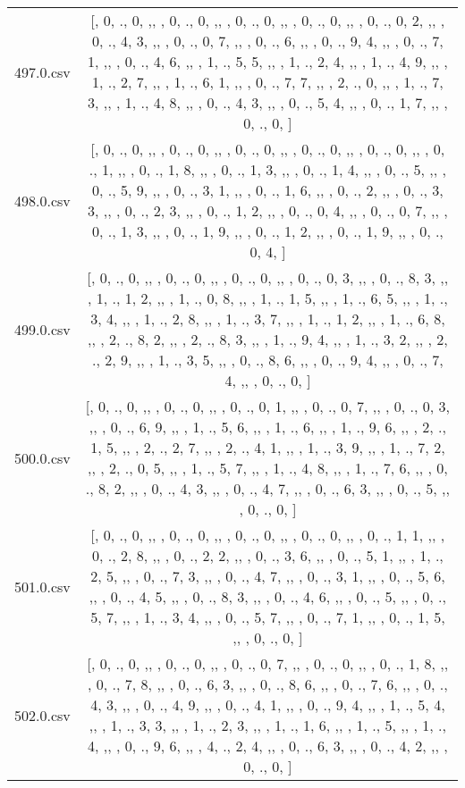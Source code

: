 \begin{table}[ht]
\begin{tabular}{@{}c c@{}}
	497.0.csv & [, 0, ., 0, ,,  , 0, ., 0, ,,  , 0, ., 0, ,,  , 0, ., 0, ,,  , 0, ., 0, 2, ,,  , 0, ., 4, 3, ,,  , 0, ., 0, 7, ,,  , 0, ., 6, ,,  , 0, ., 9, 4, ,,  , 0, ., 7, 1, ,,  , 0, ., 4, 6, ,,  , 1, ., 5, 5, ,,  , 1, ., 2, 4, ,,  , 1, ., 4, 9, ,,  , 1, ., 2, 7, ,,  , 1, ., 6, 1, ,,  , 0, ., 7, 7, ,,  , 2, ., 0, ,,  , 1, ., 7, 3, ,,  , 1, ., 4, 8, ,,  , 0, ., 4, 3, ,,  , 0, ., 5, 4, ,,  , 0, ., 1, 7, ,,  , 0, ., 0, ]\\ 
	498.0.csv & [, 0, ., 0, ,,  , 0, ., 0, ,,  , 0, ., 0, ,,  , 0, ., 0, ,,  , 0, ., 0, ,,  , 0, ., 1, ,,  , 0, ., 1, 8, ,,  , 0, ., 1, 3, ,,  , 0, ., 1, 4, ,,  , 0, ., 5, ,,  , 0, ., 5, 9, ,,  , 0, ., 3, 1, ,,  , 0, ., 1, 6, ,,  , 0, ., 2, ,,  , 0, ., 3, 3, ,,  , 0, ., 2, 3, ,,  , 0, ., 1, 2, ,,  , 0, ., 0, 4, ,,  , 0, ., 0, 7, ,,  , 0, ., 1, 3, ,,  , 0, ., 1, 9, ,,  , 0, ., 1, 2, ,,  , 0, ., 1, 9, ,,  , 0, ., 0, 4, ]\\ 
	499.0.csv & [, 0, ., 0, ,,  , 0, ., 0, ,,  , 0, ., 0, ,,  , 0, ., 0, 3, ,,  , 0, ., 8, 3, ,,  , 1, ., 1, 2, ,,  , 1, ., 0, 8, ,,  , 1, ., 1, 5, ,,  , 1, ., 6, 5, ,,  , 1, ., 3, 4, ,,  , 1, ., 2, 8, ,,  , 1, ., 3, 7, ,,  , 1, ., 1, 2, ,,  , 1, ., 6, 8, ,,  , 2, ., 8, 2, ,,  , 2, ., 8, 3, ,,  , 1, ., 9, 4, ,,  , 1, ., 3, 2, ,,  , 2, ., 2, 9, ,,  , 1, ., 3, 5, ,,  , 0, ., 8, 6, ,,  , 0, ., 9, 4, ,,  , 0, ., 7, 4, ,,  , 0, ., 0, ]\\ 
	500.0.csv & [, 0, ., 0, ,,  , 0, ., 0, ,,  , 0, ., 0, 1, ,,  , 0, ., 0, 7, ,,  , 0, ., 0, 3, ,,  , 0, ., 6, 9, ,,  , 1, ., 5, 6, ,,  , 1, ., 6, ,,  , 1, ., 9, 6, ,,  , 2, ., 1, 5, ,,  , 2, ., 2, 7, ,,  , 2, ., 4, 1, ,,  , 1, ., 3, 9, ,,  , 1, ., 7, 2, ,,  , 2, ., 0, 5, ,,  , 1, ., 5, 7, ,,  , 1, ., 4, 8, ,,  , 1, ., 7, 6, ,,  , 0, ., 8, 2, ,,  , 0, ., 4, 3, ,,  , 0, ., 4, 7, ,,  , 0, ., 6, 3, ,,  , 0, ., 5, ,,  , 0, ., 0, ]\\ 
	501.0.csv & [, 0, ., 0, ,,  , 0, ., 0, ,,  , 0, ., 0, ,,  , 0, ., 0, ,,  , 0, ., 1, 1, ,,  , 0, ., 2, 8, ,,  , 0, ., 2, 2, ,,  , 0, ., 3, 6, ,,  , 0, ., 5, 1, ,,  , 1, ., 2, 5, ,,  , 0, ., 7, 3, ,,  , 0, ., 4, 7, ,,  , 0, ., 3, 1, ,,  , 0, ., 5, 6, ,,  , 0, ., 4, 5, ,,  , 0, ., 8, 3, ,,  , 0, ., 4, 6, ,,  , 0, ., 5, ,,  , 0, ., 5, 7, ,,  , 1, ., 3, 4, ,,  , 0, ., 5, 7, ,,  , 0, ., 7, 1, ,,  , 0, ., 1, 5, ,,  , 0, ., 0, ]\\ 
	502.0.csv & [, 0, ., 0, ,,  , 0, ., 0, ,,  , 0, ., 0, 7, ,,  , 0, ., 0, ,,  , 0, ., 1, 8, ,,  , 0, ., 7, 8, ,,  , 0, ., 6, 3, ,,  , 0, ., 8, 6, ,,  , 0, ., 7, 6, ,,  , 0, ., 4, 3, ,,  , 0, ., 4, 9, ,,  , 0, ., 4, 1, ,,  , 0, ., 9, 4, ,,  , 1, ., 5, 4, ,,  , 1, ., 3, 3, ,,  , 1, ., 2, 3, ,,  , 1, ., 1, 6, ,,  , 1, ., 5, ,,  , 1, ., 4, ,,  , 0, ., 9, 6, ,,  , 4, ., 2, 4, ,,  , 0, ., 6, 3, ,,  , 0, ., 4, 2, ,,  , 0, ., 0, ]\\ 

\end{tabular}
\end{table}
